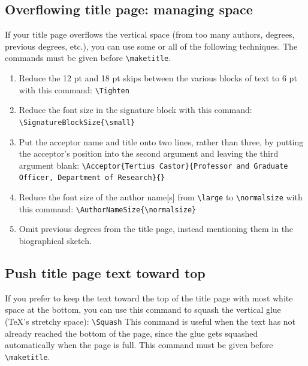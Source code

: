 \documentclass[11pt]{article}
\begin{document}
\subsection{Overflowing title page: managing space} If your title page overflows the vertical space (from too many authors, degrees, previous degrees, etc.), you can use some or all of the following techniques. The commands must be given before \verb|\maketitle|.
\begin{enumerate}
 \item Reduce the 12 pt and 18 pt skips between the various blocks of text to 6 pt with this command:
	\vskip 5pt
	\noindent\verb|\Tighten|
 \item Reduce the font size in the signature block with this command:
	\vskip 5pt
	\noindent\verb|\SignatureBlockSize{\small}| 
 \item Put the acceptor name and title onto two lines, rather than three, by putting the acceptor's position into the second argument and leaving the third argument blank:
	\vskip 5pt
	{\small\noindent\verb|\Acceptor{Tertius Castor}{Professor and Graduate Officer, Department of Research}{}|}
 \item Reduce the font size of the author name[s] from \verb|\large| to \verb|\normalsize| with this command:
	\vskip 5pt
	\noindent\verb|\AuthorNameSize{\normalsize}|
 \item Omit previous degrees from the title page, instead mentioning them in the biographical sketch.
\end{enumerate}


\subsection{Push title page text toward top} If you prefer to keep the text toward the top of the title page with most white space at the bottom, you
can use this command to squash the vertical glue (\TeX's stretchy space):
	\vskip 5pt
	\quad\verb|\Squash| 
	\vskip 5pt
\noindent This command is useful when the text has not already reached the bottom of the page, since the glue gets squashed automatically when the page is full. This command must be given before \verb|\maketitle|.
\end{document}
